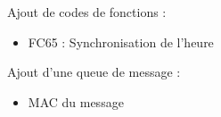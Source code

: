 \documentclass[10pt,a4paper]{article}
\begin{document}
            Ajout de codes de fonctions :
            \begin{itemize}
            \item FC65 : Synchronisation de l'heure
    	     \end{itemize}            	        

            Ajout d'une queue de message :
            \begin{itemize}
            \item MAC du message            
    	     \end{itemize}            	        
            
\end{document}
